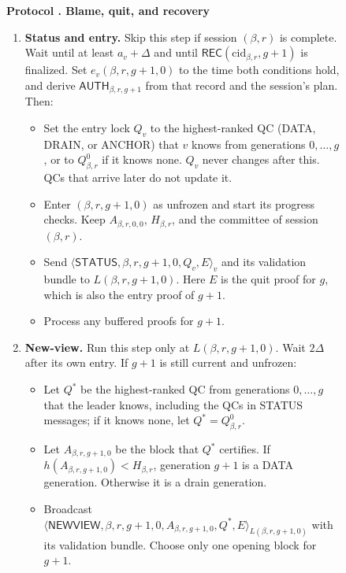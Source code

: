 \documentclass[11pt,a4paper]{article}
\newcommand{\RR}[1]{{\color{rrRed}#1}}
\newcommand{\tagg}[1]{\ensuremath{\mathsf{#1}}}
\newcounter{protocol}
\newenvironment{protocol}[3][htbp]{\begin{figure}[#1]\refstepcounter{protocol}\label{#2}
\begin{mdframed}[linewidth=.6pt,skipabove=0pt,skipbelow=0pt,
innertopmargin=7pt,innerbottommargin=7pt]\small
\textbf{Protocol \theprotocol. #3}\par\smallskip}{\end{mdframed}\end{figure}}
\begin{document}
\begin{protocol}{alg:recovery}{Blame, quit, and recovery}
\begin{enumerate}[label=\textbf{\arabic*)},itemsep=3pt]
\item \textbf{Status and entry.} \RR{Skip this step if session $(\beta,r)$ is
complete.} \RR{Wait until at least $a_v+\Delta$ and until
$\tagg{REC}(\mathrm{cid}_{\beta,r},g+1)$ is finalized. Set
$e_v(\beta,r,g+1,0)$ to the time both conditions hold, and derive
$\tagg{AUTH}_{\beta,r,g+1}$ from that record and the session's plan.} Then:
 \begin{itemize}
 \item Set the entry lock $Q_v$ to the highest-ranked QC
       (DATA\RR{, DRAIN,} or ANCHOR) that $v$ knows from generations
       $0,\ldots,g$\RR{, or to $Q_{\beta,r}^0$ if it knows none}.
       $Q_v$ never changes after this. QCs that arrive later do not
       update it.
 \item Enter $(\beta,r,g+1,0)$ as unfrozen and start its progress checks.
       \RR{Keep $A_{\beta,r,0,0}$, $H_{\beta,r}$, and the committee of session $(\beta,r)$.}
 \item Send $\langle\tagg{STATUS},\beta,r,g+1,0,Q_v,E\rangle_v$ and its
       validation bundle to $L(\beta,r,g+1,0)$. Here $E$ is the quit proof for
       $g$, which is also the entry proof of $g+1$.
 \item Process any buffered proofs for $g+1$.
 \end{itemize}

\item \textbf{New-view.} Run this step only at $L(\beta,r,g+1,0)$. Wait $2\Delta$
after its own entry. If $g+1$ is still current and unfrozen:
 \begin{itemize}
 \item Let $Q^*$ be the highest-ranked QC from generations $0,\ldots,g$
       that the leader knows, including the QCs in STATUS
       messages\RR{; if it knows none, let $Q^*=Q_{\beta,r}^0$}.
 \item Let $A_{\beta,r,g+1,0}$ be the block that $Q^*$ certifies. \RR{If
       $h(A_{\beta,r,g+1,0})<H_{\beta,r}$, generation $g+1$ is a DATA generation.
       Otherwise it is a drain generation.}
 \item Broadcast
       $\langle\tagg{NEWVIEW},\beta,r,g+1,0,A_{\beta,r,g+1,0},Q^*,E\rangle_{L(\beta,r,g+1,0)}$
       with its validation bundle. Choose only one opening block for
       $g+1$.
 \end{itemize}


\end{enumerate}
\end{protocol}
\end{document}
